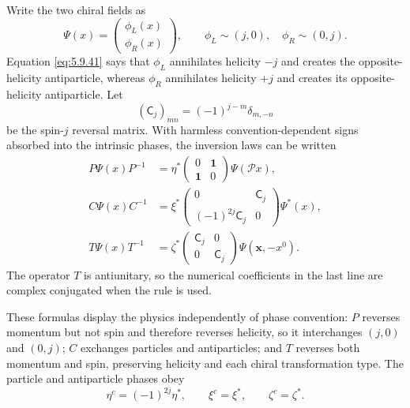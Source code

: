 \begin{enumerate}
Write the two chiral fields as
\[
 \Psi(x)=
 \begin{pmatrix}\phi_L(x)\\ \phi_R(x)\end{pmatrix},
 \qquad
 \phi_L\sim(j,0),\quad \phi_R\sim(0,j).
\]
Equation \eqref{eq:5.9.41} says that \(\phi_L\) annihilates helicity
\(-j\) and creates the opposite-helicity antiparticle, whereas \(\phi_R\)
annihilates helicity \(+j\) and creates its opposite-helicity antiparticle.
Let
\[
 (\mathsf C_j)_{mn}=(-1)^{j-m}\delta_{m,-n}
\]
be the spin-\(j\) reversal matrix.  With harmless convention-dependent
signs absorbed into the intrinsic phases, the inversion laws can be written
\[
\begin{split}
 P\Psi(x)P^{-1}
 &=\eta^*
 \begin{pmatrix}0&\mathbf{1}\\ \mathbf{1}&0\end{pmatrix}
 \Psi(\mathcal P x),\\
 C\Psi(x)C^{-1}
 &=\xi^*
 \begin{pmatrix}0&\mathsf C_j\\
 (-1)^{2j}\mathsf C_j&0\end{pmatrix}
 \Psi^*(x),\\
 T\Psi(x)T^{-1}
 &=\zeta^*
 \begin{pmatrix}\mathsf C_j&0\\0&\mathsf C_j\end{pmatrix}
 \Psi(\mathbf x,-x^0).
\end{split}
\]
The operator \(T\) is antiunitary, so the numerical coefficients in the last
line are complex conjugated when the rule is used.

These formulas display the physics independently of phase convention:
\(P\) reverses momentum but not spin and therefore reverses helicity, so it
interchanges \((j,0)\) and \((0,j)\); \(C\) exchanges particles and
antiparticles; and \(T\) reverses both momentum and spin, preserving
helicity and each chiral transformation type.  The particle and antiparticle
phases obey
\[
 \eta^c=(-1)^{2j}\eta^*,\qquad
 \xi^c=\xi^*,\qquad
 \zeta^c=\zeta^*.
\]


\end{enumerate}
